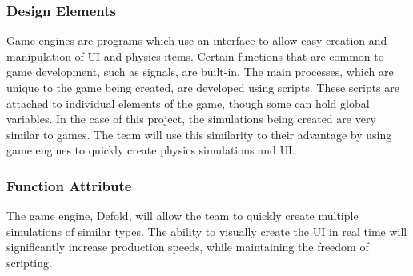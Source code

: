 \documentclass[onecolumn, draftclsnofoot,10pt, compsoc]{IEEEtran}
\begin{document}
\subsubsection{Design Elements}
Game engines are programs which use an interface to allow easy creation and manipulation of UI and physics items. Certain functions that are common to game development, such as signals, are built-in. The main processes, which are unique to the game being created, are developed using scripts. These scripts are attached to individual elements of the game, though some can hold global variables. In the case of this project, the simulations being created are very similar to games. The team will use this similarity to their advantage by using game engines to quickly create physics simulations and UI.


\subsubsection{Function Attribute}
The game engine, Defold, will allow the team to quickly create multiple simulations of similar types. The ability to visually create the UI in real time will significantly increase production speeds, while maintaining the freedom of scripting.
\newline
\end{document}
